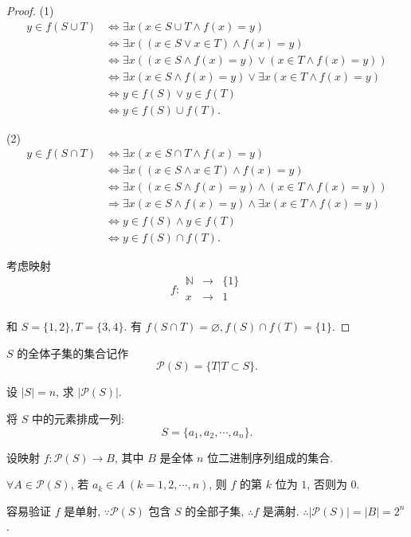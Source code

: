 \documentclass[color=black,device=normal,lang=cn,mode=geye]{elegantnote}
\begin{document}
\begin{proof}
    (1)
    \begin{align*}
        y\in f(S\cup T) & \Leftrightarrow\exists x(x\in S\cup T\land f(x)=y) \\
        & \Leftrightarrow\exists x((x\in S\vee x\in T)\land f(x)=y) \\
        & \Leftrightarrow\exists x((x\in S\land f(x)=y)\vee(x\in T\land f(x)=y)) \\
        & \Leftrightarrow\exists x(x\in S\land f(x)=y)\vee\exists x(x\in T\land f(x)=y) \\
        & \Leftrightarrow y\in f(S)\vee y\in f(T) \\
        & \Leftrightarrow y\in f(S)\cup f(T).
    \end{align*}

    (2)
    \begin{align*}
        y\in f(S\cap T) & \Leftrightarrow\exists x(x\in S\cap T\land f(x)=y) \\
        & \Leftrightarrow\exists x((x\in S\land x\in T)\land f(x)=y) \\
        & \Leftrightarrow\exists x((x\in S\land f(x)=y)\land(x\in T\land f(x)=y)) \\
        & \Rightarrow\exists x(x\in S\land f(x)=y)\land\exists x(x\in T\land f(x)=y) \\
        & \Leftrightarrow y\in f(S)\land y\in f(T) \\
        & \Leftrightarrow y\in f(S)\cap f(T).
    \end{align*}

    考虑映射
    \[f:\begin{array}{rcl}
        \mathbb{N} & \to & \{1\} \\
        x & \to & 1 \\
    \end{array}\]

    和 $S=\{1,2\},T=\{3,4\}$. 有 $f(S\cap T)=\varnothing,f(S)\cap f(T)=\{1\}$.
\end{proof}
\begin{exercise}%
    $S$ 的全体子集的集合记作
    \[\mathcal{P}(S)=\{T|T\subset S\}.\]

    设 $|S|=n$, 求 $|\mathcal{P}(S)|$.
\end{exercise}
\begin{solution}
    将 $S$ 中的元素排成一列:
    \[S=\{a_1,a_2,\cdots,a_n\}.\]

    设映射 $f:\mathcal{P}(S)\to B$, 其中 $B$ 是全体 $n$ 位二进制序列组成的集合.

    $\forall A\in\mathcal{P}(S)$, 若 $a_k\in A\ (k=1,2,\cdots,n)$, 则 $f$ 的第 $k$ 位为 $1$, 否则为 $0$.

    容易验证 $f$ 是单射, $\because\mathcal{P}(S)$ 包含 $S$ 的全部子集, $\therefore f$ 是满射. $\therefore|\mathcal{P}(S)|=|B|=2^n$.
\end{solution}
\end{document}
